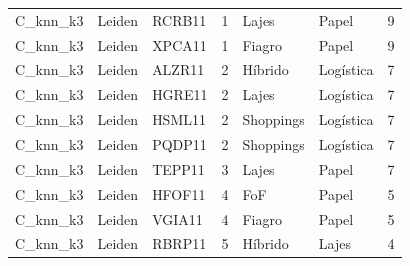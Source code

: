 \begin{tabular}{lllrllr}
C\_knn\_k3 & Leiden & RCRB11 & 1 & Lajes & Papel & 9 \\
C\_knn\_k3 & Leiden & XPCA11 & 1 & Fiagro & Papel & 9 \\
C\_knn\_k3 & Leiden & ALZR11 & 2 & Híbrido & Logística & 7 \\
C\_knn\_k3 & Leiden & HGRE11 & 2 & Lajes & Logística & 7 \\
C\_knn\_k3 & Leiden & HSML11 & 2 & Shoppings & Logística & 7 \\
C\_knn\_k3 & Leiden & PQDP11 & 2 & Shoppings & Logística & 7 \\
C\_knn\_k3 & Leiden & TEPP11 & 3 & Lajes & Papel & 7 \\
C\_knn\_k3 & Leiden & HFOF11 & 4 & FoF & Papel & 5 \\
C\_knn\_k3 & Leiden & VGIA11 & 4 & Fiagro & Papel & 5 \\
C\_knn\_k3 & Leiden & RBRP11 & 5 & Híbrido & Lajes & 4 \\
\bottomrule
\end{tabular}
